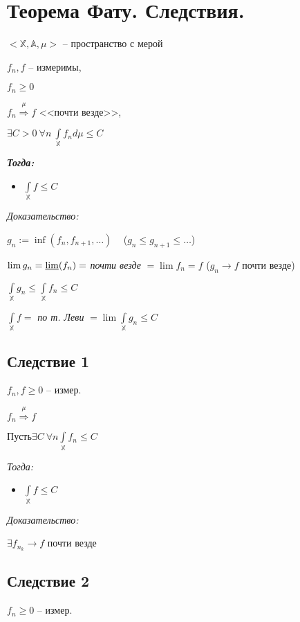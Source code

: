 \documentclass[paper=a4, fontsize=13.2pt]{article}
\begin{document}
\section{Теорема Фату. Следствия.}
$<\mathbb{X}, \mathbb{A}, \mu>$ -- пространство с мерой

$f_n, f$ -- измеримы,

$f_n \geq 0$

$f_n\stackrel{\mu}{\Rightarrow}f$ <<почти везде>>,

$\exists C > 0 ~ \forall n ~ \int\limits_{\mathbb{X}} f_n d\mu \leq C$

\textbf{\emph{Тогда:}}
\begin{itemize}
\item $\int\limits_{\mathbb{X}}f \leq C$
\end{itemize}

\emph{Доказательство:}

$ g_n := \inf(f_n, f_{n+1}, \dots ) $ ~ ($ g_n \leq g_{n+1} \leq \dots $)

$ \lim g_n = \varliminf(f_n) = $ \textit{почти везде} $ = \lim f_n  = f$ ($ g_n \rightarrow f $ почти везде)


$ \int\limits_{\mathbb{X}} g_n \leq \int\limits_{\mathbb{X}} f_n \leq C $

$ \int\limits_{\mathbb{X}} f = $ \textit{по т. Леви} $ = \lim \int\limits_{\mathbb{X}} g_n \leq C$

\subsection{Следствие 1}

$ f_n, f \geq 0$ -- измер.

$ f_n \stackrel{\mu}{\Rightarrow} f$

$ Пусть \exists C ~ \forall n  \int\limits_{\mathbb{X}} f_n \leq C $ 

\emph{Тогда:} 
\begin{itemize}
	\item $ \int\limits_{\mathbb{X}}  f \leq C $
\end{itemize}

\emph{Доказательство:}

$ \exists f_{n_k} \rightarrow f $ почти везде

\subsection{Следствие 2}

$ f_n \geq 0 $ -- измер.
\end{document}

